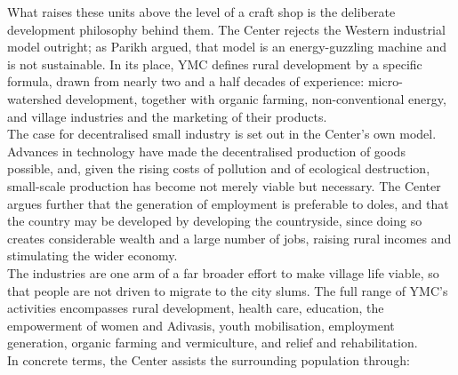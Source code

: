 \documentclass[a4paper, 11pt]{article}
\begin{document}
		What raises these units above the level of a craft shop is the deliberate development philosophy behind them. The Center rejects the Western industrial model outright; as Parikh argued, that model is an energy-guzzling machine and is not sustainable. In its place, YMC defines rural development by a specific formula, drawn from nearly two and a half decades of experience: micro-watershed development, together with organic farming, non-conventional energy, and village industries and the marketing of their products.\\
		
		The case for decentralised small industry is set out in the Center's own model. Advances in technology have made the decentralised production of goods possible, and, given the rising costs of pollution and of ecological destruction, small-scale production has become not merely viable but necessary. The Center argues further that the generation of employment is preferable to doles, and that the country may be developed by developing the countryside, since doing so creates considerable wealth and a large number of jobs, raising rural incomes and stimulating the wider economy.\\
		
		The industries are one arm of a far broader effort to make village life viable, so that people are not driven to migrate to the city slums. The full range of YMC's activities encompasses rural development, health care, education, the empowerment of women and Adivasis, youth mobilisation, employment generation, organic farming and vermiculture, and relief and rehabilitation. \\
		
		In concrete terms, the Center assists the surrounding population through:
		
\end{document}
